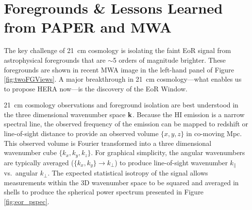 \documentclass[preprint]{aastex}
\def\kperp{k_{\bot}}
\def\kpar{k_{\|}}
\def\k{{\bf k}}
\def\HI{{H{\small I }}}
\begin{document}


\vspace{-0.25in}
\section{Foregrounds \& Lessons Learned from PAPER and MWA}
\label{LessonsSec}

The key challenge of 21~cm cosmology is isolating the faint EoR signal from
astrophysical foregrounds that are $\sim$5 orders of magnitude brighter. These foregrounds
are shown in recent MWA image 
in the left-hand panel of Figure \ref{fig:twoFGViews}. A major breakthrough in
21~cm cosmology---what enables us to propose HERA now---is the discovery of the
EoR Window.

21~cm cosmology observations and foreground isolation are best understood in
the three dimensional wavenumber space $\k$.  Because the \HI emission is a
narrow spectral line, the observed frequency of the emission can be mapped to
redshift or line-of-sight distance to provide an observed volume $\{x,y,z\}$ in
co-moving Mpc. This observed volume is Fourier transformed into a three dimensional
wavenumber cube $\{k_{x}, k_{y}, k_{z}\}$. For graphical simplicity, the angular
wavenumbers are typically averaged ($\{k_{x},k_{y}\}\rightarrow\kperp$) to
produce line-of-sight wavenumber $\kpar$ vs.\ angular $\kperp$. 
The expected statistical isotropy of the signal allows measurements within the 3D wavenumber space to be
squared and averaged in shells to produce the spherical power spectrum
presented in Figure \ref{fig:eor_pspec}.
\end{document}
